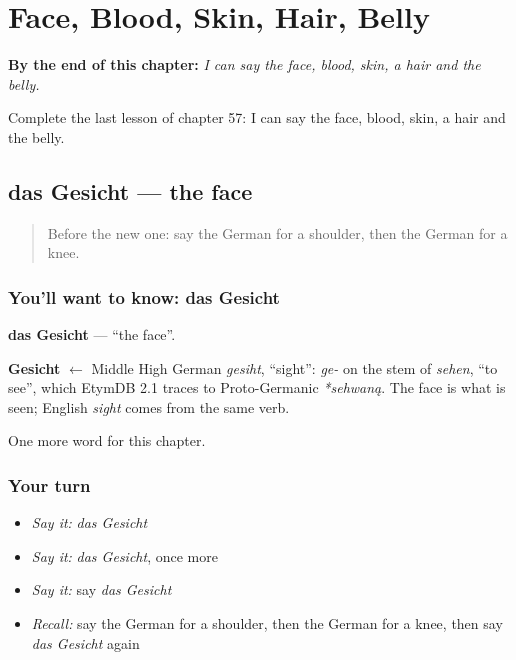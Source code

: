 
\chapter{Face, Blood, Skin, Hair, Belly}
\label{ch:ge-face-blood-skin-hair-belly}

\begin{chapteropening}
\textbf{By the end of this chapter:} \emph{I can say the face, blood, skin, a hair and the belly.}

Complete the last lesson of chapter 57: I can say the face, blood, skin, a hair and the belly.
\end{chapteropening}

\section[das Gesicht]{das Gesicht — the face}

\label{lesson:GE-C57-gesicht}



\begin{quote}
Before the new one: say the German for a shoulder, then the German for a knee.
\end{quote}

\subsection*{You'll want to know: das Gesicht}
\textbf{das Gesicht} — \textquotedblleft{}the face\textquotedblright{}.

\begin{cousinweb}
\textbf{Gesicht} $\leftarrow$ Middle High German \emph{gesiht}, \textquotedblleft{}sight\textquotedblright{}: \emph{ge-} on the stem of \emph{sehen}, \textquotedblleft{}to see\textquotedblright{}, which EtymDB 2.1 traces to Proto-Germanic \emph{*sehwaną}. The face is what is seen; English \emph{sight} comes from the same verb.
\end{cousinweb}

\begin{grammarlens}[title={What you've built}]
One more word for this chapter.
\end{grammarlens}

\subsection*{Your turn}
\begin{itemize}
\raggedright
  \item \emph{Say it:} \emph{das Gesicht}
  \item \emph{Say it:} \emph{das Gesicht}, once more
  \item \emph{Say it:} say \emph{das Gesicht}
  \item \emph{Recall:} say the German for a shoulder, then the German for a knee, then say \emph{das Gesicht} again
\end{itemize}

